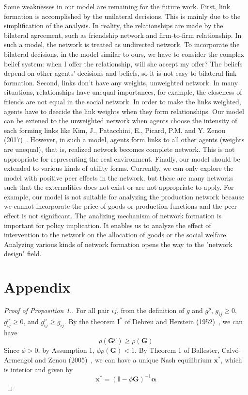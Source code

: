 \documentclass[12pt]{article}
\theoremstyle{definition}
\begin{document}
Some weaknesses in our model are remaining for the future work.
First, link formation is accomplished by the unilateral decisions.
This is mainly due to the simplification of the analysis.
In reality, the relationships are made by the bilateral agreement, such as friendship network and firm-to-firm relationship.
In such a model, the network is treated as undirected network.
To incorporate the bilateral decisions, in the model similar to ours, we have to consider the complex belief system: when I offer the relationship, will she accept my offer?
The beliefs depend on other agents' decisions and beliefs, so it is not easy to bilateral link formation.
Second, links don't have any weights, unweighted network.
In many situations, relationships have unequal importances, for example, the closeness of friends are not equal in the social network.
In order to make the links weighted, agents have to deecide the link weights when they form relationships.
Our model can be extened to the unweighted network when agents choose the intensity of each forming links like Kim, J., Patacchini, E., Picard, P.M. and Y. Zenou (2017)~\cite{Urban}.
However, in such a model, agents form links to all other agents (weights are unequal), that is, realized network becomes complete network.
This is not appropriate for representing the real environment.
Finally, our model should be extended to various kinds of utility forms.
Currently, we can only explore the model with positive peer effects in the network, but these are many networks such that the externalities does not exist or are not appropriate to apply.
For example, our model is not suitable for analyzing the production network because we cannot incorporate the price of goods or production functions and the peer effect is not significant.
The analizing mechanism of network formation is important for policy implication.
It enables us to analyze the effect of intervention to the network on the allocation of goods or the social welfare.
Analyzing various kinds of network formation opens the way to the "network design" field.


\section{Appendix}

\begin{proof}[Proof of Proposition 1.]
	For all pair $ij$, from the definition of $g$ and $g^p$, $g_{ij} \ge 0$, $g_{ij}^p \ge 0$, and $g_{ij}^p \ge g_{ij}$.
	By the theorem $\text{I}^*$ of Debreu and Herstein (1952)~\cite{debreu}, we can have
	\[ \rho(\bm{G}^p) \ge \rho(\bm{G})  \]
	Since $\phi > 0$, by Assumption 1, $\phi \rho(\bm{G}) < 1$.
	By Theorem 1 of Ballester, Calv\'{o}-Armengol and Zenou (2005)~\cite{whowho}, we can have a unique Nash equilibrium $\bm{x}^*$, which is interior and given by
	\[ \bm{x}^* = {(\bm{I} - \phi \bm{G})}^{-1} \bm{\alpha} \] 
\end{proof}
\end{document}
